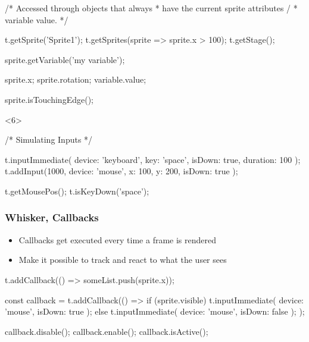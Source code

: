 \begin{frame}[fragile]
\begin{onlyenv}
\begin{minipage}{.6\textwidth}
\begin{javascriptcode}
                /* Accessed through objects that always
                 * have the current sprite attributes /
                 * variable value. */

                t.getSprite('Sprite1');
                t.getSprites(sprite => sprite.x > 100);
                t.getStage();

                sprite.getVariable('my variable');

                sprite.x;
                sprite.rotation;
                variable.value;

                sprite.isTouchingEdge();
            \end{javascriptcode}
        \end{minipage}
    \end{onlyenv}
    \begin{onlyenv}<6>
        \begin{minipage}{.6\textwidth}
            \begin{javascriptcode}
                /* Simulating Inputs */

                t.inputImmediate({
                    device: 'keyboard',
                    key: 'space',
                    isDown: true,
                    duration: 100
                });
                t.addInput(1000, {
                    device: 'mouse',
                    x: 100,
                    y: 200,
                    isDown: true
                });

                t.getMousePos();
                t.isKeyDown('space');
            \end{javascriptcode}
        \end{minipage}
    \end{onlyenv}
\end{frame}

\begin{frame}[fragile]\frametitle{Whisker, Callbacks}
    \begin{itemize}
        \item Callbacks get executed every time a frame is rendered
        \item Make it possible to \textcolor{upfim}{track} and \textcolor{upfim}{react} to what the user sees
    \end{itemize}

    \begin{javascriptcode}
        t.addCallback(() => someList.push(sprite.x));

        const callback = t.addCallback(() => {
            if (sprite.visible) {
                t.inputImmediate({ device: 'mouse', isDown: true });
            } else {
                t.inputImmediate({ device: 'mouse', isDown: false });
            }
        });

        callback.disable();
        callback.enable();
        callback.isActive();
    \end{javascriptcode}
\end{frame}

